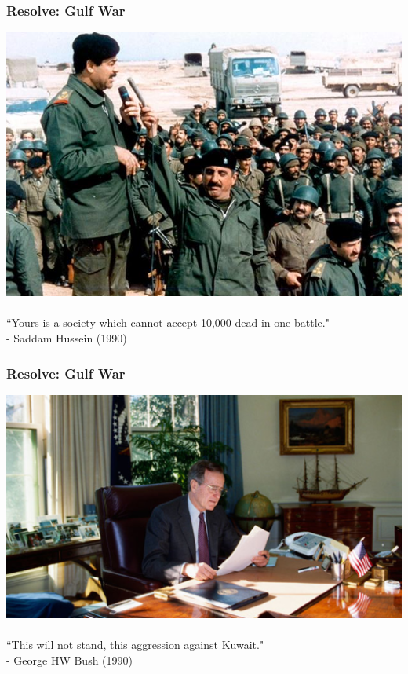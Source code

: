 \documentclass[handout]{beamer}
\begin{document}
\begin{frame} 
	\frametitle{\LARGE{Resolve: Gulf War}}
	\centering
	\includegraphics[width=\textwidth,height=0.63\textheight,keepaspectratio]{saddamiraqiarmy.jpg}
	\\~\\
	``Yours is a society which cannot accept 10,000 dead in one battle." \\
	\hspace*{160pt} - Saddam Hussein (1990)
\end{frame}

\begin{frame} 
	\frametitle{\LARGE{Resolve: Gulf War}}
	\centering
	\includegraphics[width=\textwidth,height=0.7\textheight,keepaspectratio]{ghwbush.jpg}
	\\~\\
	``This will not stand, this aggression against Kuwait." \\
	\hspace*{160pt} - George HW Bush (1990)
\end{frame}
\end{document}
